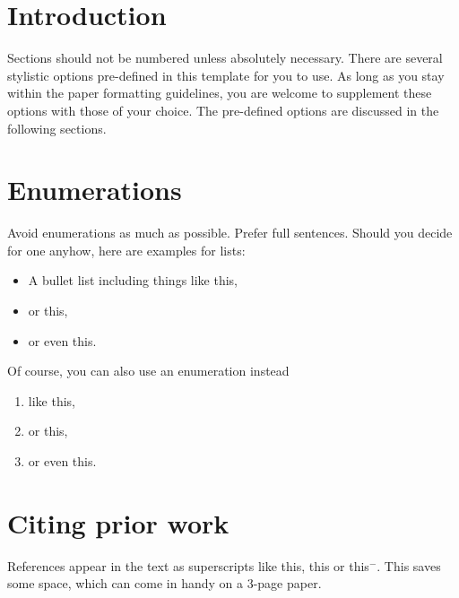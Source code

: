\documentclass[a4paper, oneside, twocolumn, notitlepage, 10pt]{style/extarticle_ecoc2015}
\begin{document}

\section{Introduction}
Sections should not be numbered unless absolutely necessary. There are several stylistic options pre-defined in this template for you to use. As long as you stay within the paper formatting guidelines, you are welcome to supplement these options with those of your choice. The pre-defined options are discussed in the following sections.


\section{Enumerations}
Avoid enumerations as much as possible. Prefer full sentences. Should you decide for one anyhow, here are examples for lists:
\begin{itemize}
\item A bullet list including things like this,
\item or this,
\item or even this.
\end{itemize}
Of course, you can also use an enumeration instead
\begin{enumerate}
\item like this,
\item or this,
\item or even this.
\end{enumerate}


\section{Citing prior work}
References appear in the text as superscripts like this\cite{ref1}, this\cite{ref1,ref2} or this\cite{ref1}$^-$\cite{ref3}. This saves some space, which can come in handy on a 3-page paper.

\end{document}
